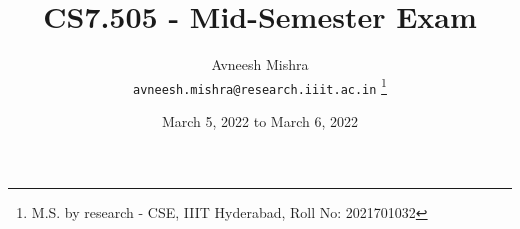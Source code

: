 

{
   \fancyhf{}
   \renewcommand{\headrulewidth}{0pt} %
}

\title{CS7.505 - Mid-Semester Exam}

\author{
    Avneesh Mishra \\
    \texttt{avneesh.mishra@research.iiit.ac.in}
    \thanks{M.S. by research - CSE, IIIT Hyderabad, Roll No: 2021701032}
}

\date{March 5, 2022 to March 6, 2022}


    \maketitle
    \thispagestyle{fancy_tr_rno}
    \tableofcontents
    \listoffigures
    \lstlistoflistings
    \pagebreak
    
    \pagebreak
    
    \pagebreak
    
    \pagebreak
    
    \pagebreak
    
    \pagebreak
    \printbibliography

